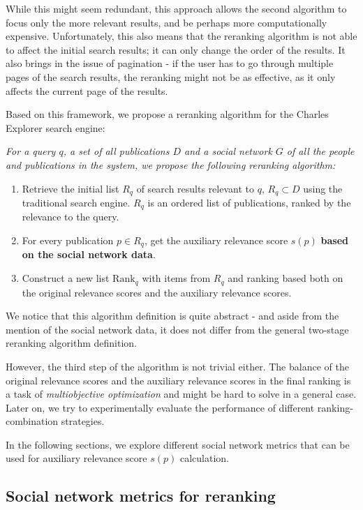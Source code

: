 While this might seem redundant, this approach allows the second algorithm to focus only the more relevant results, 
and be perhaps more computationally expensive.
Unfortunately, this also means that the reranking algorithm is not able to affect the initial search results; 
it can only change the order of the results. It also brings in the issue of pagination - if the user has to go 
through multiple pages of the search results, the reranking might not be as effective, as it only affects the current page of the results.

Based on this framework, we propose a reranking algorithm for the Charles Explorer search engine:

\textit{For a query $q$, a set of all publications $D$ and a social network $G$ of all the people and publications in the system, 
we propose the following reranking algorithm:}

\begin{enumerate}
    \item Retrieve the initial list $R_q$ of search results relevant to $q$, $R_q \subset D$ using the traditional search engine.
    $R_q$ is an ordered list of publications, ranked by the relevance to the query.
    \item For every publication $p \in R_q$, get the auxiliary relevance score $s(p)$ \textbf{based on the social network data}.
    \item Construct a new list $\text{Rank}_q$ with items from $R_q$ and ranking based both on the original relevance scores and the auxiliary relevance scores.
\end{enumerate}

We notice that this algorithm definition is quite abstract - and aside from the mention of the social network data, 
it does not differ from the general two-stage reranking algorithm definition.

However, the third step of the algorithm is not trivial either. The balance of the original relevance scores and the auxiliary relevance scores
in the final ranking is a task of \textit{multiobjective optimization} and might be hard to solve in a general case.
Later on, we try to experimentally evaluate the performance of different ranking-combination strategies.

In the following sections, we explore different social network metrics that can be used for auxiliary relevance score $s(p)$ calculation.

\subsection{Social network metrics for reranking}\label{social-network-metrics}

